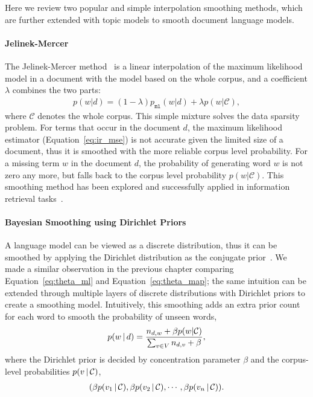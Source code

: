 Here we review two popular and simple interpolation smoothing
methods, which are further extended with topic models to smooth document
language models.

\paragraph{Jelinek-Mercer}

The Jelinek-Mercer method~\citep{Jelinek-1980} is a linear
interpolation of the maximum likelihood model in a document with the
model based on the whole corpus, and a coefficient $\lambda$ combines the two parts:
\begin{align}
p(w|d) = (1 - \lambda) p_{\texttt{ml}}(w|d) + \lambda p(w|\mathcal{C}),
\label{eq:lm-jr}
\end{align}
where $\mathcal{C}$ denotes the whole corpus. This simple mixture
solves the data sparsity problem. For terms that occur in the document
$d$, the maximum likelihood estimator (Equation~\ref{eq:ir_mse}) is
not accurate given the limited size of a document, thus it is smoothed
with the more reliable corpus level probability. For a missing term
$w$ in the document $d$, the probability of generating word $w$ is not
zero any more, but falls back to the corpus level probability
$p(w|\mathcal{C})$.  This smoothing method has been explored and
successfully applied in information retrieval
tasks~\citep{PonteCroft,song-99}.

\paragraph{Bayesian Smoothing using Dirichlet Priors}

A language model can be viewed as a discrete distribution, thus it can
be smoothed by applying the Dirichlet distribution as the conjugate
prior~\citep{mackay95dirichlet}. We made a similar observation in the
previous chapter comparing Equation~\ref{eq:theta_ml} and
Equation~\ref{eq:theta_map}; the same intuition can be extended
through multiple layers of discrete distributions with Dirichlet
priors to create a smoothing model. Intuitively, this smoothing adds
an extra prior count for each word to smooth the probability of unseen
words,
\begin{align}
p(w \, | \, d) = \frac{n_{d,w} + \beta p(w|\mathcal{C})}{\sum_{v \in V} n_{d,v} + \beta},
\end{align}
where the Dirichlet prior is decided by concentration parameter $\beta$ and the
corpus-level probabilities $p(v \, | \, \mathcal{C})$,
\begin{align}
(\beta p(v_1 \, | \, \mathcal{C}), \beta p(v_2 \, | \, \mathcal{C}), \cdots, \beta p(v_n \, | \, \mathcal{C})).
\label{eq:lm-bs}
\end{align}

